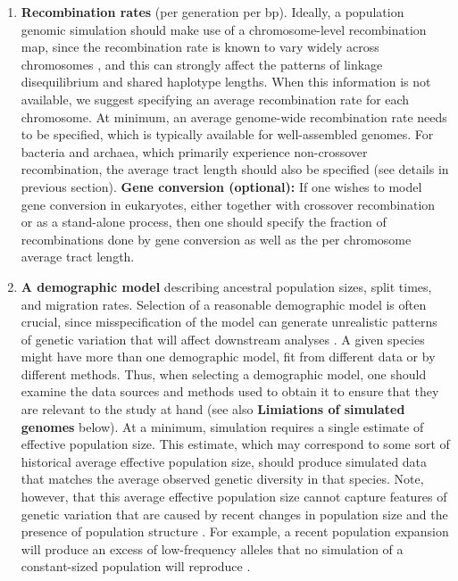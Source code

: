 \documentclass[hidelinks]{article}
\begin{document}
\begin{enumerate}
\item
  \textbf{Recombination rates} (per generation per bp).
  Ideally, a population genomic simulation should make use of a chromosome-level 
  {recombination map}, 
  since the recombination rate is known to vary widely across chromosomes \citep{Nachman2002},
  and this can strongly affect the patterns of linkage disequilibrium and shared haplotype lengths.
  When this information is not available, we suggest specifying an average recombination rate for each chromosome.
  At minimum, an average genome-wide recombination rate needs to be specified, which is typically available for well-assembled genomes.
  For bacteria and archaea, which primarily experience non-crossover recombination,
  the average tract length should also be specified
  (see details in previous section).
  \textbf{Gene conversion (optional):} If one wishes to model gene conversion in eukaryotes, either together with crossover recombination or as a stand-alone process,
  then one should specify the fraction of recombinations done by gene conversion
  as well as the per chromosome average tract length.

\item
  \textbf{A demographic model} describing 
  ancestral population sizes, split times, and migration rates.
  Selection of a reasonable demographic model is often crucial,
  since misspecification of the model can generate unrealistic patterns of genetic variation that will affect downstream analyses \citep[e.g.,][]{Navascues2009}.
  A given species might have more than one demographic model, fit from different data or by different methods.
  Thus, when selecting a demographic model, one should examine the data sources and methods used to obtain it to ensure that they are relevant to the study at hand
  (see also {\bf Limiations of simulated genomes} below).
  At a minimum, simulation requires a single estimate of {effective population size}. This estimate, which may correspond to some sort of historical average effective population size,
  should produce simulated data that matches the average observed genetic diversity in that species. Note, however, that this average effective population size cannot capture features of genetic variation that are caused by recent changes in population size and the presence of population structure \citep{MacLeod2013,Eldon2015}.
  For example, a recent population expansion will produce
  an excess of low-frequency alleles that no simulation of a constant-sized
  population will reproduce \citep{Tennessen2012}.


\end{enumerate}
\end{document}
